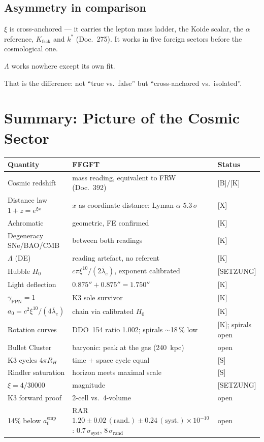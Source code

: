 \section{Asymmetry in comparison}

$\xi$ is cross-anchored — it carries the lepton mass ladder, the Koide
scalar, the $\alpha$ reference, $K_\text{frak}$ and $k^*$ (Doc.~275).
It works in five foreign sectors before the cosmological one.

$\Lambda$ works nowhere except its own fit.

That is the difference: not ``true vs.\ false'' but
``cross-anchored vs.\ isolated''.

\chapter{Summary: Picture of the Cosmic Sector}

\begin{center}
\begin{tabular}{lll}
\toprule
Quantity & FFGFT & Status \\
\midrule
Cosmic redshift & mass reading, equivalent to FRW (Doc.~392) & [B]/[K] \\
Distance law $1+z = e^{\xi x}$ & $x$ as coordinate distance: Lyman-$\alpha$ $5.3\,\sigma$ & [X] \\
Achromatic & geometric, FE confirmed & [K] \\
Degeneracy SNe/BAO/CMB & between both readings & [K] \\
$\Lambda$ (DE) & reading artefact, no referent & [K] \\
Hubble $H_0$ & $c\pi\xi^{10}/(2\bar\lambda_e)$, exponent calibrated & [SETZUNG] \\
Light deflection & $0.875'' + 0.875'' = 1.750''$ & [K] \\
$\gamma_\text{PPN} = 1$ & K3 sole survivor & [K] \\
$a_0 = c^2\xi^{10}/(4\bar\lambda_e)$ & chain via calibrated $H_0$ & [K] \\
Rotation curves & DDO~154 ratio 1.002; spirals $\sim$18\,\% low & [K]; spirals open \\
Bullet Cluster & baryonic: peak at the gas (240~kpc) & open \\
K3 cycles $4\pi R_H$ & time $+$ space cycle equal & [S] \\
Rindler saturation & horizon meets maximal scale & [S] \\
$\xi = 4/30000$ & magnitude & [SETZUNG] \\
K3 forward proof & 2-cell vs.\ 4-volume & open \\
14\% below $a_0^\text{emp}$ & RAR $1.20\pm0.02\,(\text{rand.})\pm0.24\,(\text{syst.})\times10^{-10}$: $0.7\,\sigma_\text{syst}$, $8\,\sigma_\text{rand}$ & open \\
\bottomrule
\end{tabular}
\end{center}

